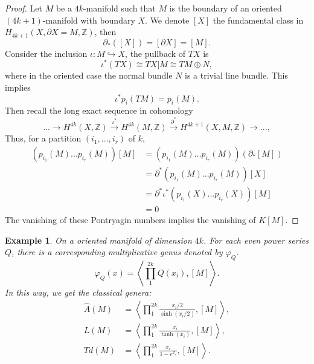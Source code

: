 \documentclass[11pt]{article}
\newtheorem{ex}[thm]{Example}
\newcommand{\intg}{\mathbb Z}
\begin{document}
\begin{proof}
 		Let $M$ be a $4k$-manifold such that $M$ is the boundary of an oriented $(4k+1)$-manifold with boundary $X$.
 		We denote $[X]$  the fundamental class in $H_{4k+1}(X,\partial X=M,\intg)$, then
 		\begin{equation*}
 			\partial_*([X])=[\partial X]=[M].
 		\end{equation*}
 		Consider the inclusion $\iota: M\hookrightarrow X$,
 		the pullback of $TX$ is 
 		\begin{equation*}
 			\iota^*(TX)\cong TX|M\cong TM\oplus N,
 		\end{equation*}
 		where in the oriented case the normal bundle $N$ is a trivial line bundle. This implies
 		\begin{equation*}
 			\iota^*p_i(TM)=p_i(M).
 		\end{equation*}
 		Then recall the long exact sequence in cohomology
 		\begin{equation*}
 		...\rightarrow H^{4k}(X,\intg)\overset{\iota^*}{\rightarrow}H^{4k}(M,\intg)\overset{\partial^*}{\rightarrow}H^{4k+1}(X,M,\intg)\rightarrow...,
 		\end{equation*}
 		Thus, for a partition $(i_1,...,i_r)$ of $k$,
 		\begin{equation*}
 		\begin{aligned}
 			(p_{i_1}(M)...p_{i_r}(M))[M]
 			&=(p_{i_1}(M)...p_{i_r}(M))(\partial_*[M])\\
 			&=\partial^*(p_{i_1}(M)...p_{i_r}(M))[X]\\
 			&=\partial^*\iota^*(p_{i_1}(X)...p_{i_r}(X))[M]\\
 			&=0
 		\end{aligned}
 		\end{equation*}
 		The vanishing of these Pontryagin numbers implies the vanishing of $K[M]$.
 	\end{proof}
 	\begin{ex}
 		On a oriented manifold of dimension $4k$. For each even power series $Q$, there is a corresponding multiplicative genus denoted by $\varphi_Q$.
 		\begin{equation*}
 			\varphi_Q(x)=\left\langle\prod_1^{2k} Q(x_i),[M]\right\rangle.
 		\end{equation*}
 		In this way, we get the classical genera:
 		\begin{equation*}
 			\begin{aligned}
 				\hat{A}(M)&=\left\langle\prod_1^{2k} \frac{x_i/2}{\sinh(x_i/2)},[M]\right\rangle,\\
 				L(M)&= \left\langle\prod_1^{2k} \frac{x_i}{\tanh(x_i)},[M]\right\rangle,\\
 				Td(M)&=\left\langle\prod_1^{2k} \frac{x_i}{1-e^{x_i}},[M]\right\rangle.
 			\end{aligned}
 		\end{equation*}
 	\end{ex}
\end{document}
